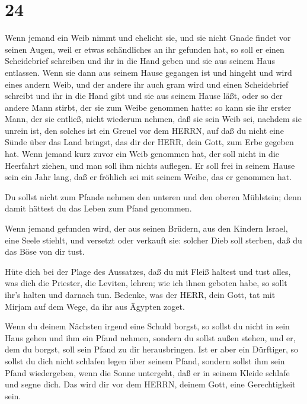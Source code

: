 \hypertarget{section-23}{%
\section{24}\label{section-23}}

 Wenn jemand ein Weib nimmt und ehelicht sie, und sie nicht
Gnade findet vor seinen Augen, weil er etwas schändliches an ihr
gefunden hat, so soll er einen Scheidebrief schreiben und ihr in die
Hand geben und sie aus seinem Haus entlassen.  Wenn sie dann
aus seinem Hause gegangen ist und hingeht und wird eines andern Weib,
 und der andere ihr auch gram wird und einen Scheidebrief
schreibt und ihr in die Hand gibt und sie aus seinem Hause läßt, oder so
der andere Mann stirbt, der sie zum Weibe genommen hatte: 
so kann sie ihr erster Mann, der sie entließ, nicht wiederum nehmen, daß
sie sein Weib sei, nachdem sie unrein ist, den solches ist ein Greuel
vor dem HERRN, auf daß du nicht eine Sünde über das Land bringst, das
dir der HERR, dein Gott, zum Erbe gegeben hat.  Wenn jemand
kurz zuvor ein Weib genommen hat, der soll nicht in die Heerfahrt
ziehen, und man soll ihm nichts auflegen. Er soll frei in seinem Hause
sein ein Jahr lang, daß er fröhlich sei mit seinem Weibe, das er
genommen hat.

 Du sollst nicht zum Pfande nehmen den unteren und den
oberen Mühlstein; denn damit hättest du das Leben zum Pfand genommen.

 Wenn jemand gefunden wird, der aus seinen Brüdern, aus den
Kindern Israel, eine Seele stiehlt, und versetzt oder verkauft sie:
solcher Dieb soll sterben, daß du das Böse von dir tust.

 Hüte dich bei der Plage des Aussatzes, daß du mit Fleiß
haltest und tust alles, was dich die Priester, die Leviten, lehren; wie
ich ihnen geboten habe, so sollt ihr's halten und darnach tun.
 Bedenke, was der HERR, dein Gott, tat mit Mirjam auf dem
Wege, da ihr aus Ägypten zoget.

 Wenn du deinem Nächsten irgend eine Schuld borgst, so
sollst du nicht in sein Haus gehen und ihm ein Pfand nehmen,
 sondern du sollst außen stehen, und er, dem du borgst,
soll sein Pfand zu dir herausbringen.  Ist er aber ein
Dürftiger, so sollst du dich nicht schlafen legen über seinem Pfand,
 sondern sollst ihm sein Pfand wiedergeben, wenn die Sonne
untergeht, daß er in seinem Kleide schlafe und segne dich. Das wird dir
vor dem HERRN, deinem Gott, eine Gerechtigkeit sein.

